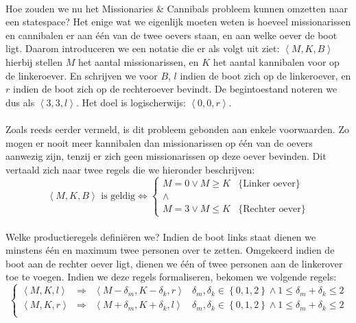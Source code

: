 \paragraph{}
\begin{leftbar}
Hoe zouden we nu het Missionaries \& Cannibals probleem kunnen omzetten naar een statespace? Het enige wat we eigenlijk moeten weten is hoeveel missionarissen en cannibalen er aan \'e\'en van de twee oevers staan, en aan welke oever de boot ligt. Daarom introduceren we een notatie die er als volgt uit ziet: $\left\langle M,K,B\right\rangle$ hierbij stellen $M$ het aantal missionarissen, en $K$ het aantal kannibalen voor op de linkeroever. En schrijven we voor $B$, $l$ indien de boot zich op de linkeroever, en $r$ indien de boot zich op de rechteroever bevindt. De begintoestand noteren we dus als $\left\langle3,3,l\right\rangle$. Het doel is logischerwijs: $\left\langle0,0,r\right\rangle$.
\paragraph{}
Zoals reeds eerder vermeld, is dit probleem gebonden aan enkele voorwaarden. Zo mogen er nooit meer kannibalen dan missionarissen op \'e\'en van de oevers aanwezig zijn, tenzij er zich geen missionarissen op deze oever bevinden. Dit vertaald zich naar twee regels die we hieronder beschrijven:
\begin{equation}
\left\langle M,K,B\right\rangle\mbox{ is geldig}\Leftrightarrow\left\{
\begin{array}{cl}
M=0\vee M\geq K&\mbox{\{Linker oever\}}\\
\wedge\\
M=3\vee M\leq K&\mbox{\{Rechter oever\}}
\end{array}\right.
\end{equation}
\paragraph{}
Welke productieregels defini\"eren we? Indien de boot links staat dienen we minstens \'e\'en en maximum twee personen over te zetten. Omgekeerd indien de boot aan de rechter oever ligt, dienen we \'e\'en of twee personen aan de linkerover toe te voegen. Indien we deze regels formaliseren, bekomen we volgende regels:
\begin{equation}
\left\{\begin{array}{rcl|l}
\left\langle M,K,l\right\rangle&\Rightarrow&\left\langle M-\delta_m,K-\delta_k,r\right\rangle&\delta_m,\delta_k\in\left\{0,1,2\right\}\wedge1\leq\delta_m+\delta_k\leq 2\\
\left\langle M,K,r\right\rangle&\Rightarrow&\left\langle M+\delta_m,K+\delta_k,l\right\rangle&\delta_m,\delta_k\in\left\{0,1,2\right\}\wedge1\leq\delta_m+\delta_k\leq 2\\
\end{array}\right.
\end{equation}
\end{leftbar}
